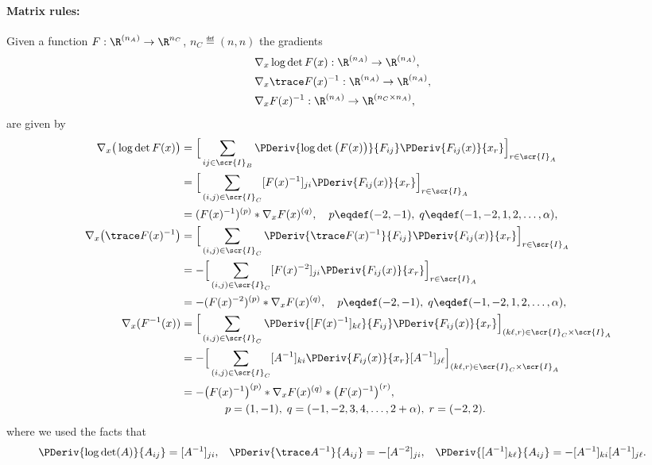 \documentclass[11pt]{article}
\theoremstyle{remark}
\begin{document}
\paragraph{Matrix rules:} Given a function
$F:\R^{(n_A)}\to\R^{{n_C}}$, $n_C\eqdef(n,n)$ the gradients
\begin{align*}
  &\nabla_x \log\det F(x):\R^{(n_A)}\to\R^{(n_A)}, \\
  &\nabla_x \trace F(x)^{-1}:\R^{(n_A)}\to\R^{(n_A)}, \\
  &\nabla_x F(x)^{-1}:\R^{(n_A)}\to\R^{(n_C\times n_A)}, &
\end{align*}
are given by
\begin{align*}
  \nabla_x \big(\log\det F (x)\big)
  &= \Big[\sum_{ij\in\scr{I}_B}\PDeriv{\log\det\big(F(x)\big)}{F_{ij}}\PDeriv{F_{ij}(x)}{x_r}\Big]_{r\in\scr{I}_A}\\
  &= \Big[\sum_{(i,j)\in\scr{I}_C}[F(x)^{-1}]_{ji}
  \PDeriv{F_{ij}(x)}{x_r}\Big]_{r\in\scr{I}_A}\\
  &= (F(x)^{-1})^{(p)} * \nabla_x F(x)^{(q)}, \quad
  p\eqdef(-2,-1), \;
  q\eqdef(-1,-2,1,2,\dots,\alpha),\\
  \nabla_x \big(\trace F(x)^{-1}\big)
  &= \Big[\sum_{(i,j)\in\scr{I}_C}\PDeriv{\trace F(x)^{-1}}{F_{ij}}
  \PDeriv{F_{ij}(x)}{x_r}\Big]_{r\in\scr{I}_A}\\
  &=-\Big[\sum_{(i,j)\in\scr{I}_C}[F(x)^{-2}]_{ji}
  \PDeriv{F_{ij}(x)}{x_r}\Big]_{r\in\scr{I}_A}\\
  &= -(F(x)^{-2})^{(p)} * \nabla_x F(x)^{(q)}, \quad
  p\eqdef(-2,-1), \;
  q\eqdef(-1,-2,1,2,\dots,\alpha),\\
  \nabla_x (F^{-1}(x))
  &= \Big[\sum_{(i,j)\in\scr{I}_C}\PDeriv{[F(x)^{-1}]_{k\ell}}{F_{ij}}
  \PDeriv{F_{ij}(x)}{x_r}\Big]_{(k\ell,r)\in\scr{I}_C\times\scr{I}_A}\\
  &= -\Big[\sum_{(i,j)\in\scr{I}_C}[A^{-1}]_{ki}
  \PDeriv{F_{ij}(x)}{x_r}[A^{-1}]_{j\ell}\Big]_{(k\ell,r)\in\scr{I}_C\times\scr{I}_A}\\
  &= - \big(F(x)^{-1}\big)^{(p)} * \nabla_x F(x)^{(q)} * \big(F(x)^{-1}\big)^{(r)},
  \\&\qquad\qquad
  p=(1,-1), \;
  q=(-1,-2,3,4,\dots,2+\alpha),\;
  r=(-2,2).
\end{align*}
where we used the facts that
\begin{align*}
  &\PDeriv{\log\det(A)}{A_{ij}}=[A^{-1}]_{ji}, &
  &\PDeriv{\trace A^{-1}}{A_{ij}}=-[A^{-2}]_{ji}, &
  &\PDeriv{[A^{-1}]_{k\ell}}{A_{ij}}=-[A^{-1}]_{ki}[A^{-1}]_{j\ell}.
\end{align*}
\end{document}
